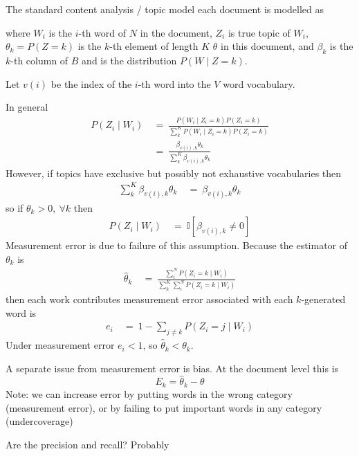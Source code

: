 \documentclass[12pt]{article}
\begin{document}
The standard content analysis / topic model each document is modelled as

\begin{center}
\end{center}
where 
$W_i$ is the $i$-th word of $N$ in the document,
$Z_i$ is true topic of $W_i$,
$\theta_k = P(Z = k)$ is the $k$-th  element of length $K$ $\theta$ in this document, and 
$\beta_k$ is the $k$-th column of $B$ and is the distribution $P(W \mid Z = k)$.

Let $v(i)$ be the index of the $i$-th word into the $V$ word vocabulary.

In general
\begin{align*}
   P(Z_i \mid W_{i}) &~=~ \frac{P(W_i \mid Z_i=k) P(Z_i=k)}{\sum^K_k P(W_i \mid Z_i=k) P(Z_i=k)}\\
    &~=~ \frac{\beta_{v(i),k} \theta_k}{\sum^K_k \beta_{v(i),k} \theta_k}
\end{align*}
However, if topics have exclusive but possibly not exhaustive vocabularies then 
\begin{align*}
\sum^K_k \beta_{v(i),k} \theta_k &~=~ \beta_{v(i),k} \theta_k  
\end{align*}
so if $\theta_k > 0, ~ \forall k$ then 
\begin{align*}
P(Z_i \mid W_{i}) &~=~ \mathbb{I}[\beta_{v(i),k} \neq 0]
\end{align*}
Measurement error is due to failure of this assumption. Because 
the estimator of $\theta_k$ is
\begin{align*}
\hat{\theta}_k &~=~ \frac{\sum^N_i P(Z_i=k \mid W_{i})}{\sum^K_k \sum^N_i  P(Z_i = k \mid W_{i})}
\end{align*}
then each work contributes measurement error associated with each $k$-generated word is 
\begin{align*}
  e_i &~=~ 1 - \sum_{j\neq k} P(Z_i=j \mid W_{i})
\end{align*}
Under measurement error $e_i < 1$, so $\hat{\theta}_k < \theta_k$.

A separate issue from measurement error is bias. At the document level this is 
$$
E_k = \hat{\theta}_k - \theta
$$
Note: we can increase error by putting words in the wrong category (measurement error), or by failing to put important words in any category (undercoverage)

Are the precision and recall? Probably
\end{document}
